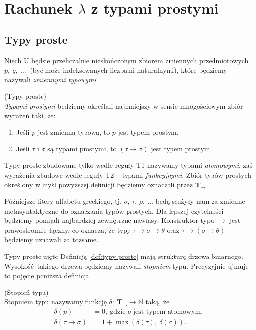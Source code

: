 \section{Rachunek \(\lambda\) z typami prostymi}


\subsection{Typy proste}\label{ssec:typy-proste}
Niech \(\mathrm{U}\) będzie przeliczalnie nieskończonym zbiorem zmiennych przedmiotowych \(p,\ q,\ \dots\ \) (być może indeksowanych liczbami naturalnymi), które będziemy nazywali \emph{zmiennymi typowymi}.\begin{definicja}\label{def:typy-proste}(Typy proste)\\
\emph{Typami prostymi} będziemy określali najmniejszy w sensie mnogościowym zbiór wyrażeń taki, że:
\begin{enumerate}[label=T\arabic*.]
  \item Jeśli \(p\) jest zmienną typową, to \(p\) jest typem prostym.
  \item Jeśli \(\tau\) i \(\sigma\) są typami prostymi, to \(\left(\tau\to\sigma\right)\) jest typem prostym.
\end{enumerate}
\end{definicja}

Typy proste zbudowane tylko wedle reguły T1 nazywamy typami \emph{atomowymi}, zaś wyrażenia zbudowe wedle reguły T2 -- typami \emph{funkcyjnymi}. Zbiór typów prostych określony w myśl powyższej definicji będziemy oznaczali przez \(\mathbf{T_\to}\).

Późniejsze litery alfabetu greckiego, tj. \(\sigma,\, \tau,\, \rho,\ \dots\) będą służyły nam za zmienne metasyntaktyczne do oznaczania typów prostych. Dla lepszej czytelności będziemy pomijali najbardziej zewnętrzne nawiasy. Konstruktor typu \(\to\) jest prawostronnie łączny, co oznacza, że typy \(\tau\to\sigma\to\theta\) oraz \(\tau\to(\sigma\to\theta)\) będziemy uznawali za tożsame.

Typy proste ujęte Definicją \ref{def:typy-proste} mają strukturę drzewa binarnego. Wysokość takiego drzewa będziemy nazywali \emph{stopniem} typu. Precyzyjnie ujmuje to pojęcie poniższa definicja.
\begin{definicja}\label{def:stopien-typu}(Stopień typu)\\
  Stopniem typu nazywamy funkcję \(\delta :\: \mathbf{T}_\to \longrightarrow \mathbb{N}\) taką, że
  \begin{align*}
    \delta(p) &= 0,\ \text{gdzie \(p\) jest typem atomowym},\\
    \delta(\tau\to\sigma)&=1 + \max\left(\delta(\tau),\ \delta(\sigma)\right).
  \end{align*}
\end{definicja}

